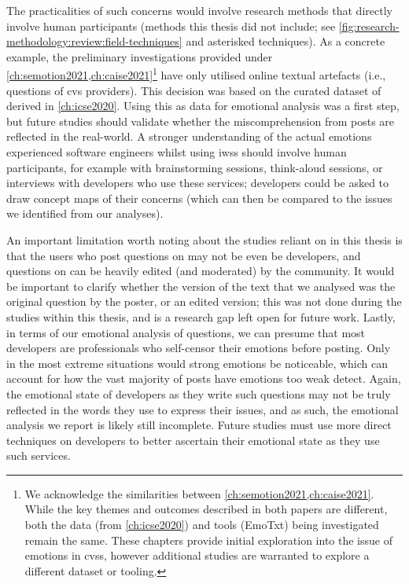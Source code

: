 The practicalities of such concerns would involve research methods that directly involve human participants (methods this thesis did not include; see \cref{fig:research-methodology:review:field-techniques} and asterisked techniques). As a concrete example, the preliminary investigations provided under \cref{ch:semotion2021,ch:caise2021}\footnote{We acknowledge the similarities between \cref{ch:semotion2021,ch:caise2021}. While the key themes and outcomes described in both papers are different, both the data (from \cref{ch:icse2020}) and tools (EmoTxt) being investigated remain the same. These chapters provide initial exploration into the issue of emotions in \glspl{cvs}, however additional studies are warranted to explore a different dataset or tooling.} have only utilised online textual artefacts (i.e.,  questions of \gls{cvs} providers). This decision was based on the curated dataset of  derived in \cref{ch:icse2020}. Using this as data for emotional analysis was a first step, but future studies should validate whether the miscomprehension from  posts are reflected in the real-world. A stronger understanding of the actual emotions experienced software engineers whilst using \glspl{iws} should involve human participants, for example with brainstorming sessions, think-aloud sessions, or interviews with developers who use these services; developers could be asked to draw concept maps of their concerns (which can then be compared to the issues we identified from our analyses).

An important limitation worth noting about the studies reliant on  in this thesis is that the users who post questions on  may not be even be developers, and questions on  can be heavily edited (and moderated) by the  community. It would be important to clarify whether the version of the text that we analysed was the original question by the poster, or an edited version; this was not done during the studies within this thesis, and is a research gap left open for future work. Lastly, in terms of our emotional analysis of  questions, we can presume that most developers are professionals who self-censor their emotions before posting. Only in the most extreme situations would strong emotions be noticeable, which can account for how the vast majority of posts have emotions too weak detect. Again, the emotional state of developers as they write such questions may not be truly reflected in the words they use to express their issues, and as such, the emotional analysis we report is likely still incomplete. Future studies must use more direct techniques on developers to better ascertain their emotional state as they use such services.

